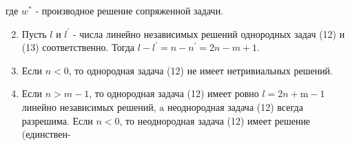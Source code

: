 \documentclass[10pt]{article}
\begin{document}
где $w^{*}$ - производное решение сопряженной задачи.



\begin{enumerate}

  \setcounter{enumi}{1}

  \item Пусть $l$ и $l^{\prime}$ - числа линейно независимых решений однородных задач (12) и (13) соответственно. Тогда $l-l^{\prime}=n-n^{\prime}=2 n-m+1$.



  \item Если $n<0$, то однородная задача (12) не имеет нетривиальных решений.



  \item Если $n>m-1$, то однородная задача (12) имеет ровно $l=2 n+\mathrm{m}-1$ линейно независимых решений, $\mathrm{a}$ неоднородная задача (12) всегда разрешима. Если $n<0$, то неоднородная задача (12) имеет решение (единствен-



\end{enumerate}
\end{document}
